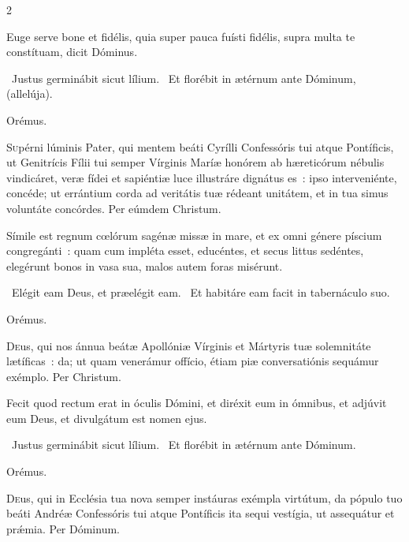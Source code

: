 \documentclass[9pt,twoside]{extarticle}
\begin{document}
\begin{multicols}{2}
\begin{tightlist}{}
\item {} Euge serve bone et fidélis, quia super pauca fuísti fidélis, supra multa te constítuam, dicit Dóminus.
\item {}~Justus germinábit sicut lílium. ~Et florébit in ætérnum ante Dóminum, (allelúja).
\item Orémus. \hfill {}
\end{tightlist}
\lettrine{S}upérni lúminis Pater, qui mentem beáti Cyrílli Confessóris tui atque Pontíficis, ut Genitrícis Fílii tui semper Vírginis Maríæ honórem ab hæreticórum nébulis vindicáret, veræ fídei et sapiéntiæ luce illustráre dignátus es~: ipso interveniénte, concéde; ut errántium corda ad veritátis tuæ rédeant unitátem, et in tua simus voluntáte concórdes. Per eúmdem Christum.

\begin{tightlist}{}
\item {} Símile est regnum cœlórum sagénæ missæ in mare, et ex omni génere píscium congregánti~: quam cum impléta esset, educéntes, et secus littus sedéntes, elegérunt bonos in vasa sua, malos autem foras misérunt.
\item {}~Elégit eam Deus, et præelégit eam. ~Et habitáre eam facit in tabernáculo suo.
\item Orémus. \hfill {}
\end{tightlist}
\lettrine{D}eus, qui nos ánnua beátæ Apollóniæ Vírginis et Mártyris tuæ solemnitáte lætíficas~: da; ut quam venerámur offício, étiam piæ conversatiónis sequámur exémplo. Per Christum.

\begin{tightlist}{}
\item {} Fecit quod rectum erat in óculis Dómini, et diréxit eum in ómnibus, et adjúvit eum Deus, et divulgátum est nomen ejus.
\item {}~Justus germinábit sicut lílium. ~Et florébit in ætérnum ante Dóminum.
\item Orémus. \hfill {}
\end{tightlist}
\lettrine{D}eus, qui in Ecclésia tua nova semper instáuras exémpla virtútum, da pópulo tuo beáti Andréæ Confessóris tui atque Pontíficis ita sequi vestígia, ut assequátur et prǽmia. Per Dóminum.

\begin{tightlist}{}
\item {}
\end{tightlist}


\end{multicols}
\end{document}
